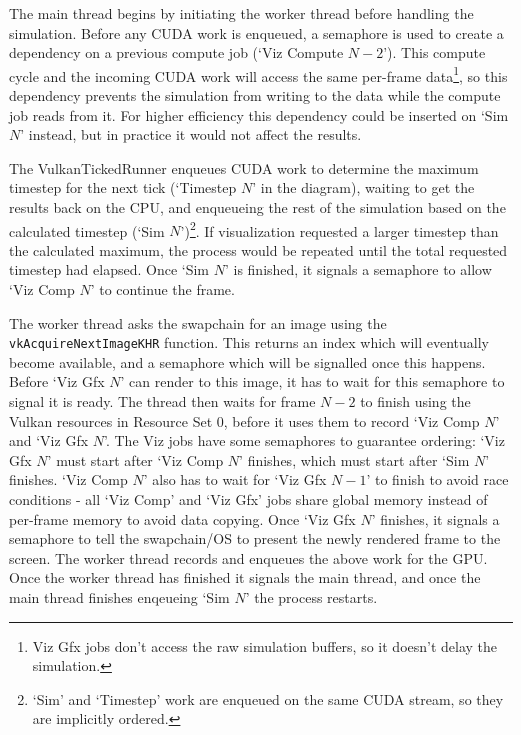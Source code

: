 The main thread begins by initiating the worker thread before handling the simulation.
Before any CUDA work is enqueued, a semaphore is used to create a dependency on a previous compute job (`Viz Compute $N - 2$'). %
This compute cycle and the incoming CUDA work will access the same per-frame data\footnote{Viz Gfx jobs don't access the raw simulation buffers, so it doesn't delay the simulation.}, so this dependency prevents the simulation from writing to the data while the compute job reads from it.
For higher efficiency this dependency could be inserted on `Sim $N$' instead, but in practice it would not affect the results.

The VulkanTickedRunner enqueues CUDA work to determine the maximum timestep for the next tick (`Timestep $N$' in the diagram), waiting to get the results back on the CPU, and enqueueing the rest of the simulation based on the calculated timestep (`Sim $N$')\footnote{`Sim' and `Timestep' work are enqueued on the same CUDA stream, so they are implicitly ordered.}.%
If visualization requested a larger timestep than the calculated maximum, the process would be repeated until the total requested timestep had elapsed.
Once `Sim $N$' is finished, it signals a semaphore to allow `Viz Comp $N$' to continue the frame. %

The worker thread asks the swapchain for an image using the \texttt{vkAcquireNextImageKHR} function.
This returns an index which will eventually become available, and a semaphore which will be signalled once this happens.
Before `Viz Gfx $N$' can render to this image, it has to wait for this semaphore to signal it is ready. %
The thread then waits for frame $N-2$ to finish using the Vulkan resources in Resource Set 0, before it uses them to record `Viz Comp $N$' and `Viz Gfx $N$'. %
The Viz jobs have some semaphores to guarantee ordering:
`Viz Gfx $N$' must start after `Viz Comp $N$' finishes, which must start after `Sim $N$' finishes. %
`Viz Comp $N$' also has to wait for `Viz Gfx $N - 1$' to finish to avoid race conditions - all `Viz Comp' and `Viz Gfx' jobs share global memory instead of per-frame memory to avoid data copying. %
Once `Viz Gfx $N$' finishes, it signals a semaphore to tell the swapchain/OS to present the newly rendered frame to the screen.
The worker thread records and enqueues the above work for the GPU.
Once the worker thread has finished it signals the main thread, and once the main thread finishes enqeueing `Sim $N$' the process restarts.

